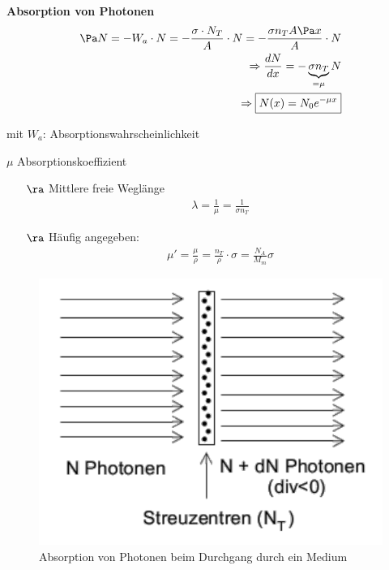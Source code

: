 \textbf{Absorption von Photonen}
\begin{align}
\begin{split}
\Pa N =-W_a\cdot N =-\frac{\sigma \cdot N_T}{A}\cdot N=-\frac{\sigma n_T A\Pa x}{A}\cdot N\\
\Rightarrow \frac{dN}{dx}=-\underbrace{\sigma n_T}_{= \mu} N\\
\Rightarrow \boxed{N(x)=N_0 e^{-\mu x}}
\end{split}
\end{align}
\begin{compactitem}
\item[mit] $W_a$: Absorptionswahrscheinlichkeit
\item[] $\mu$ Absorptionskoeffizient
\end{compactitem}
\begin{itemize}
\item[$\ra$] Mittlere freie Weglänge
\begin{align}
\boxed{\lambda=\frac{1}{\mu}=\frac{1}{\sigma n_T}}
\end{align}
\item[$\ra$] Häufig angegeben:
\begin{align}
\boxed{\mu'=\frac{\mu}{\rho}=\frac{n_T}{\rho}\cdot \sigma=\frac{N_A}{M_m}\sigma}
\end{align}
\end{itemize}
	\begin{figure}[!ht]
	\centering
	\includegraphics[width=.45\textwidth]{imgs/ep5-fig-3-12.pdf}
	\caption{Absorption von Photonen beim Durchgang durch ein Medium\label{fig:3.12}}
	\end{figure}

